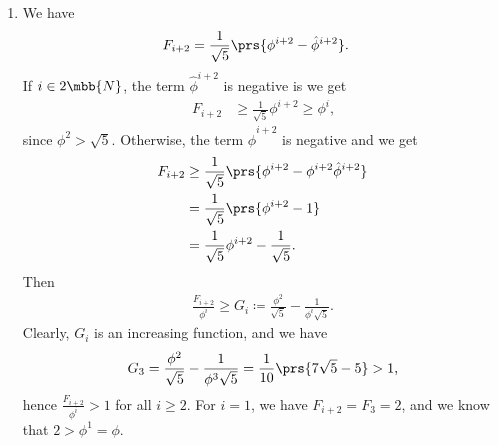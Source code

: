 \documentclass[oneside]{scrbook}
\theoremstyle{definition}
\begin{document}
\begin{problem}
\begin{enumerate}[label=\alph*.]
\item We have
\begin{align*}
F_{i+2} &= \frac{1}{\sqrt{5}} \prs{\phi^{i+2} - \hat{\phi}^{i+2}} \text{.}
\end{align*}
If $i \in 2 \mbb{N}$, the term $\hat{\phi}^{i+2}$ is negative is we get
\begin{align*}
F_{i+2} &\geq \frac{1}{\sqrt{5}} \phi^{i+2} \geq \phi^i \text{,}
\end{align*}
since $\phi^2 > \sqrt{5}$.
Otherwise, the term $\hat{\phi}^{i+2}$ is negative and we get
\begin{align*}
F_{i+2} &\geq \frac{1}{\sqrt{5}} \prs{\phi^{i+2} - \phi^{i+2} \hat{\phi}^{i+2}}
\\&= \frac{1}{\sqrt{5}}\prs{\phi^{i+2} - 1}
\\&= \frac{1}{\sqrt{5}} \phi^{i+2} - \frac{1}{\sqrt{5}} \text{.}
\end{align*}
Then
\begin{align*}
\frac{F_{i+2}}{\phi^i} \geq G_i \coloneqq  \frac{\phi^2}{\sqrt{5}} - \frac{1}{\phi^i \sqrt{5}} \text{.}
\end{align*}
Clearly, $G_i$ is an increasing function, and we have
\begin{align*}
G_3  = \frac{\phi^2}{\sqrt{5}} - \frac{1}{\phi^3 \sqrt{5}} = \frac{1}{10} \prs{7 \sqrt{5} - 5} > 1 \text{,}
\end{align*}
hence $\frac{F_{i+2}}{\phi^i} > 1$ for all $i \geq 2$.
For $i = 1$, we have
$F_{i+2} = F_3 = 2$, and we know that $2 > \phi^1 = \phi$.
\end{enumerate}
\end{problem}
\end{document}
